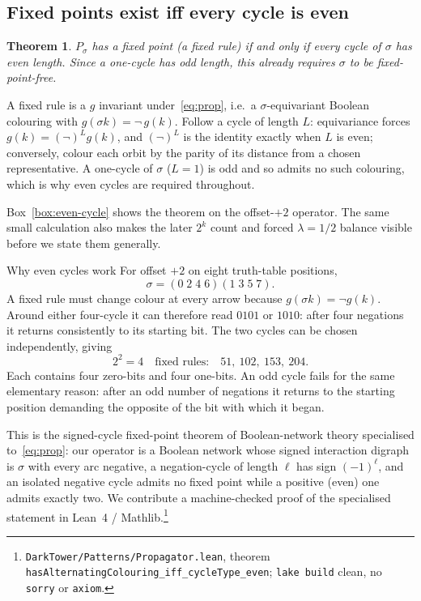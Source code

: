 \documentclass[man,12pt,floatsintext]{apa7}
\newcommand{\sig}{\sigma}
\newtheorem{theorem}{Theorem}
\begin{document}
\subsection{Fixed points exist iff every cycle is even}

\begin{theorem}\label{thm:parity}
$P_\sig$ has a fixed point (a fixed rule) if and only if every cycle of
$\sig$ has even length. Since a one-cycle has odd length, this already
requires $\sig$ to be fixed-point-free.
\end{theorem}

\noindent A fixed rule is a $g$ invariant under~\eqref{eq:prop}, i.e.\ a
$\sig$-equivariant Boolean colouring with $g(\sig k) = \lnot\,g(k)$.
Follow a cycle of length $L$: equivariance forces
$g(k) = (\lnot)^{L} g(k)$, and $(\lnot)^{L}$ is the identity exactly when
$L$ is even; conversely, colour each orbit by the parity of its distance
from a chosen representative. A one-cycle of $\sig$ ($L=1$) is odd and so
admits no such colouring, which is why even cycles are required throughout.

Box~\ref{box:even-cycle} shows the theorem on the offset-$+2$ operator. The
same small calculation also makes the later $2^k$ count and forced
$\lambda=1/2$ balance visible before we state them generally.

\begin{workedexample}[label={box:even-cycle}]{Why even cycles work}
\small
For offset $+2$ on eight truth-table positions,
\[
\sig=(0\;2\;4\;6)(1\;3\;5\;7).
\]
A fixed rule must change colour at every arrow because
$g(\sig k)=\lnot g(k)$. Around either four-cycle it can therefore read
$0101$ or $1010$: after four negations it returns consistently to its
starting bit. The two cycles can be chosen independently, giving
\[
2^2=4\quad\text{fixed rules:}\quad
51,\ 102,\ 153,\ 204.
\]
Each contains four zero-bits and four one-bits. An odd cycle fails for the
same elementary reason: after an odd number of negations it returns to the
starting position demanding the opposite of the bit with which it began.
\end{workedexample}

This is the signed-cycle fixed-point theorem of Boolean-network theory
\parencite{aracena2008maximum} specialised to~\eqref{eq:prop}: our operator
is a Boolean network whose signed interaction digraph is $\sig$ with every
arc negative, a negation-cycle of length $\ell$ has sign $(-1)^\ell$, and
an isolated negative cycle admits no fixed point while a positive (even)
one admits exactly two. We contribute a machine-checked proof of the
specialised statement in Lean~4 / Mathlib.\footnote{%
\texttt{DarkTower/Patterns/Propagator.lean}, theorem
\texttt{hasAlternatingColouring\_iff\_cycleType\_even}; \texttt{lake build}
clean, no \texttt{sorry} or \texttt{axiom}.}
\end{document}
